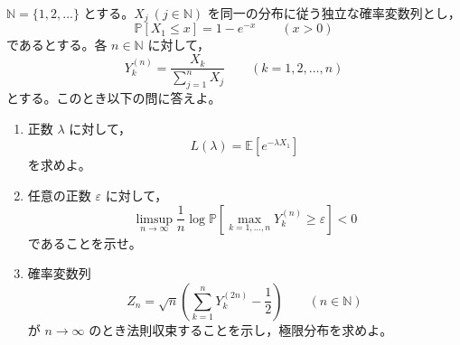 \documentclass[12pt]{jlreq}
\newcommand{\N}{\mathbb{N}}
\newcommand{\Prob}{\mathbb{P}}
\newcommand{\Exp}{\mathbb{E}}
\begin{document}
\(\N=\{1,2,\ldots\}\) とする。\(X_j\ (j\in\N)\) を同一の分布に従う独立な確率変数列とし，
\[
  \Prob[X_1\le x]=1-e^{-x}\qquad (x>0)
\]
であるとする。各 \(n\in\N\) に対して，
\[
  Y_k^{(n)}=\frac{X_k}{\sum_{j=1}^{n}X_j}\qquad (k=1,2,\ldots,n)
\]
とする。このとき以下の問に答えよ。

\begin{enumerate}
  \item 正数 \(\lambda\) に対して，
  \[
    L(\lambda)=\Exp[e^{-\lambda X_1}]
  \]
  を求めよ。
  \item 任意の正数 \(\varepsilon\) に対して，
  \[
    \limsup_{n\to\infty}\frac1n\log\Prob\left[\max_{k=1,\ldots,n}Y_k^{(n)}\ge\varepsilon\right]<0
  \]
  であることを示せ。
  \item 確率変数列
  \[
    Z_n=\sqrt n\left(\sum_{k=1}^{n}Y_k^{(2n)}-\frac12\right)\qquad (n\in\N)
  \]
  が \(n\to\infty\) のとき法則収束することを示し，極限分布を求めよ。
\end{enumerate}
\end{document}
